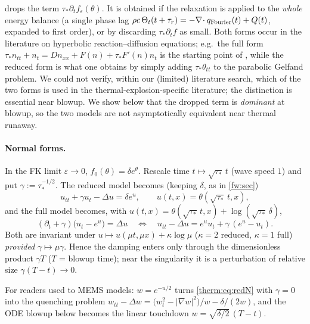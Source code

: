 drops the term $\tau_*\partial_tf_\varepsilon(\theta)$.  It is obtained if the
relaxation is applied to the \emph{whole} energy balance (a single phase lag
$\rho c\,\Theta_t(t+\tau_r)=-\nabla\!\cdot q_{\rm Fourier}(t)+Q(t)$, expanded to first
order), or by discarding $\tau_*\partial_t f$ as small.  Both forms occur in the
literature on hyperbolic reaction--diffusion equations; e.g.\ the full form
$\tau_* n_{tt}+n_t=Dn_{xx}+F(n)+\tau_* F'(n)n_t$ is the starting point of
\cite{MendezFortFarjas1999}, while the reduced form is what one obtains by simply
adding $\tau_*\theta_{tt}$ to the parabolic Gelfand problem.  We could not
verify, within our (limited) literature search, which of the two forms is used
in the thermal-explosion-specific literature; the distinction is essential near
blowup.
We show below that the dropped term is \emph{dominant} at blowup, so the two
models are not asymptotically equivalent near thermal runaway.

\paragraph{Normal forms.}  In the FK limit $\varepsilon\to0$, $f_0(\theta)=\delta e^\theta$.
Rescale time $t\mapsto\sqrt{\tau_*}\,t$ (wave speed $1$) and put $\gamma:=\tau_*^{-1/2}$.
The reduced model becomes (keeping $\delta$, as in \cref{fw:sec})
\begin{equation}\label{therm:eq:redN}
  u_{tt}+\gamma u_t-\Delta u=\delta e^{u},\qquad u(t,x)=\theta(\sqrt{\tau_*}\,t,x),
\end{equation}
and the full model becomes, with $u(t,x)=\theta(\sqrt{\tau_*}\,t,x)+\log(\sqrt{\tau_*}\,\delta)$,
\begin{equation}\label{therm:eq:fullN}
  (\partial_t+\gamma)\bigl(u_t-e^{u}\bigr)=\Delta u
  \quad\Longleftrightarrow\quad
  u_{tt}-\Delta u=e^{u}u_t+\gamma\,(e^{u}-u_t).
\end{equation}
Both are invariant under $u\mapsto u(\mu t,\mu x)+\kappa\log\mu$ ($\kappa=2$ reduced,
$\kappa=1$ full) \emph{provided} $\gamma\mapsto\mu\gamma$.  Hence the damping enters only
through the dimensionless product $\gamma T$ ($T$ = blowup time); near the
singularity it is a perturbation of relative size $\gamma(T-t)\to0$.

\begin{remark}\label{therm:rem:quench}
For readers used to MEMS models: $w=e^{-u/2}$ turns \cref{therm:eq:redN} with
$\gamma=0$ into the quenching problem
$w_{tt}-\Delta w=\bigl(w_t^2-|\nabla w|^2\bigr)/w-\delta/(2w)$, and the ODE blowup below
becomes the linear touchdown $w=\sqrt{\delta/2}\,(T-t)$.
\end{remark}

